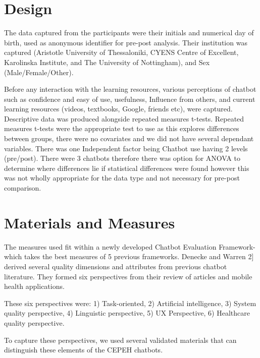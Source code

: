 \documentclass[a4paper, nobind]{templates/ociamthesis}
\begin{document}
\hypertarget{design}{%
\section{Design}\label{design}}

The data captured from the participants were their initials and numerical day of birth, used as anonymous identifier for pre-post analysis.
Their institution was captured (Aristotle University of Thessaloniki, CYENS Centre of Excellent, Karolinska Institute, and The University of Nottingham), and Sex (Male/Female/Other).

Before any interaction with the learning resources, various perceptions of chatbot such as confidence and easy of use, usefulness, Influence from others, and current learning resources (videos, textbooks, Google, friends etc), were captured.
Descriptive data was produced alongside repeated measures t-tests.
Repeated measures t-tests were the appropriate test to use as this explores differences between groups, there were no covariates and we did not have several dependant variables.
There was one Independent factor being Chatbot use having 2 levels (pre/post).
There were 3 chatbots therefore there was option for ANOVA to determine where differences lie if statistical differences were found however this was not wholly appropriate for the data type and not necessary for pre-post comparison.

\hypertarget{materials-and-measures}{%
\section{Materials and Measures}\label{materials-and-measures}}

The measures used fit within a newly developed Chatbot Evaluation Framework- which takes the best measures of 5 previous frameworks.
Denecke and Warren \hspace{0pt}{[}2{]}\hspace{0pt} derived several quality dimensions and attributes from previous chatbot literature.
They formed six perspectives from their review of articles and mobile health applications.

These six perspectives were: 1) Task-oriented, 2) Artificial intelligence, 3) System quality perspective, 4) Linguistic perspective, 5) UX Perspective, 6) Healthcare quality perspective.

To capture these perspectives, we used several validated materials that can distinguish these elements of the CEPEH chatbots.
\end{document}
